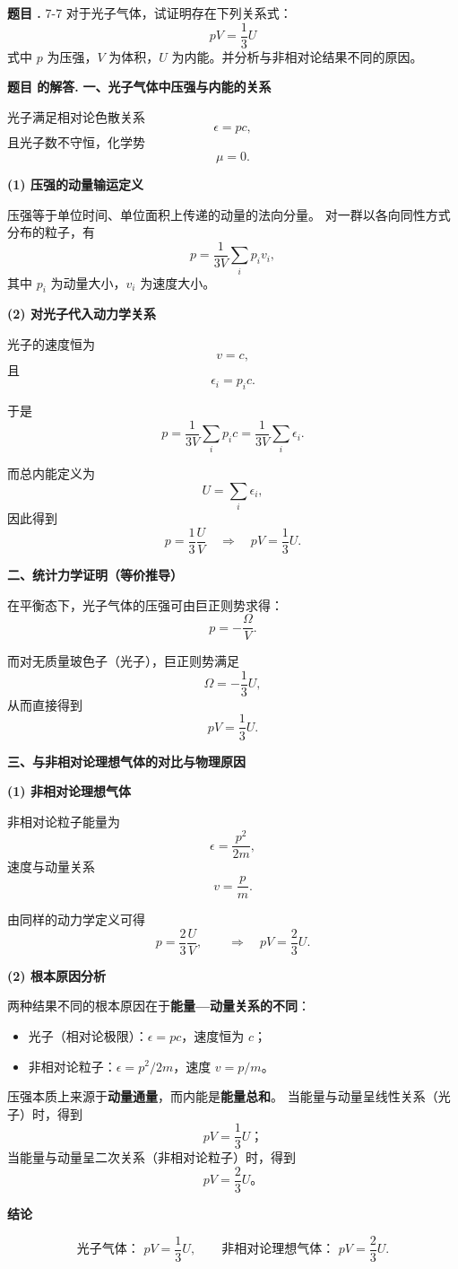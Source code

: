 \documentclass[12pt, a4paper, oneside]{ctexart}
\newcounter{problemname}
\newenvironment{problem}
  {\begin{shaded}\stepcounter{problemname}\par\noindent\textbf{题目 \theproblemname. }}
  {\end{shaded}\par}
\newenvironment{solution}
  {\par\noindent\textbf{题目 \theproblemname 的解答. }}
  {\par}
\begin{document}
\begin{problem}{7-7}
  对于光子气体，试证明存在下列关系式：
$$pV = \frac{1}{3}U$$
式中 $p$ 为压强，$V$ 为体积，$U$ 为内能。并分析与非相对论结果不同的原因。
\end{problem}

\begin{solution}
  \textbf{一、光子气体中压强与内能的关系}

光子满足相对论色散关系
\[
\epsilon = pc,
\]
且光子数不守恒，化学势
\[
\mu=0.
\]

\textbf{(1) 压强的动量输运定义}

压强等于单位时间、单位面积上传递的动量的法向分量。
对一群以各向同性方式分布的粒子，有
\[
p=\frac{1}{3V}\sum_i p_i v_i,
\]
其中 $p_i$ 为动量大小，$v_i$ 为速度大小。

\textbf{(2) 对光子代入动力学关系}

光子的速度恒为
\[
v=c,
\]
且
\[
\epsilon_i = p_i c.
\]

于是
\[
p=\frac{1}{3V}\sum_i p_i c
=\frac{1}{3V}\sum_i \epsilon_i.
\]

而总内能定义为
\[
U=\sum_i \epsilon_i,
\]
因此得到
\[
\boxed{
p=\frac{1}{3}\frac{U}{V}
}
\quad\Longrightarrow\quad
\boxed{
pV=\frac{1}{3}U.
}
\]

\textbf{二、统计力学证明（等价推导）}

在平衡态下，光子气体的压强可由巨正则势求得：
\[
p=-\frac{\Omega}{V}.
\]

而对无质量玻色子（光子），巨正则势满足
\[
\Omega=-\frac{1}{3}U,
\]
从而直接得到
\[
pV=\frac{1}{3}U.
\]

\textbf{三、与非相对论理想气体的对比与物理原因}

\textbf{(1) 非相对论理想气体}

非相对论粒子能量为
\[
\epsilon=\frac{p^2}{2m},
\]
速度与动量关系
\[
v=\frac{p}{m}.
\]

由同样的动力学定义可得
\[
p=\frac{2}{3}\frac{U}{V},
\qquad
\Rightarrow\quad
pV=\frac{2}{3}U.
\]

\textbf{(2) 根本原因分析}

两种结果不同的根本原因在于\textbf{能量—动量关系的不同}：

\begin{itemize}
\item 光子（相对论极限）：$\epsilon=pc$，速度恒为 $c$；
\item 非相对论粒子：$\epsilon=p^2/2m$，速度 $v=p/m$。
\end{itemize}

压强本质上来源于\textbf{动量通量}，而内能是\textbf{能量总和}。
当能量与动量呈线性关系（光子）时，得到
\[
pV=\frac13 U；
\]
当能量与动量呈二次关系（非相对论粒子）时，得到
\[
pV=\frac23 U。
\]

\textbf{结论}

\[
\boxed{
\text{光子气体： } pV=\frac{1}{3}U,
\qquad
\text{非相对论理想气体： } pV=\frac{2}{3}U.
}
\]
\end{solution}
\end{document}
